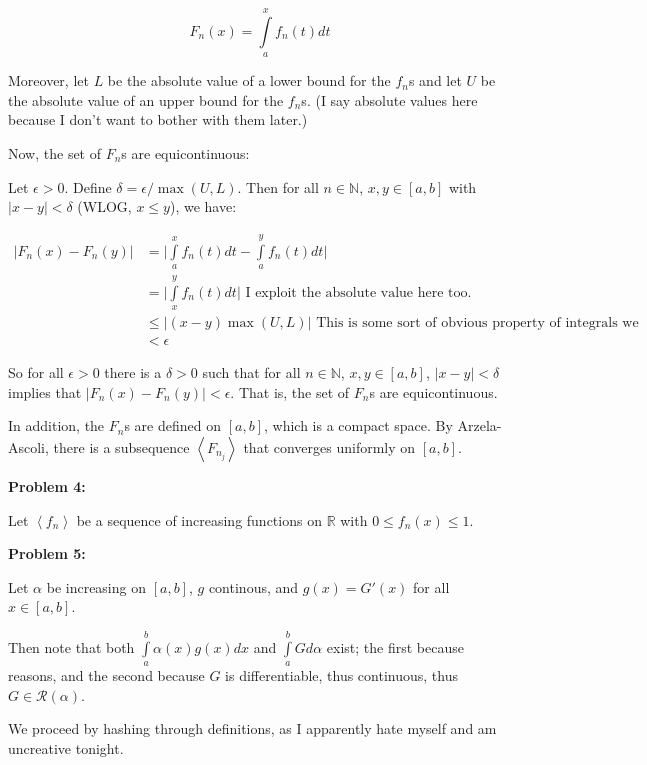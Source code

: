 \documentclass[a4paper,12pt]{article}
\newcommand{\tab}{\hspace{4mm}} %
\newcommand{\shunt}{\vspace{20mm}}
\newcommand{\absval}[1]{\lvert #1 \rvert}
\newcommand{\anbrack}[1]{\left\langle #1 \right\rangle}
\newcommand{\al}{\alpha} %
\newcommand{\de}{\delta}
\newcommand{\ep}{\epsilon}
\newcommand{\N}{\mathbb{N}}
\newcommand{\R}{\mathbb{R}}
\newcommand{\scrR}{\mathcal{R}}
\begin{document}
\begin{displaymath}
F_n(x) = \int\limits_a^x f_n(t)dt
\end{displaymath}

Moreover, let $L$ be the absolute value of a lower bound for the $f_n$s and let $U$ be the absolute value of an upper bound for the $f_n$s. (I say absolute values here because I don't want to bother with them later.)

Now, the set of $F_n$s are equicontinuous:

\tab Let $\ep >0$. Define $\de = \ep /\max(U,L)$. Then for all $n \in \N$, $x, y \in [a,b]$ with $\absval{x-y} < \de$ (WLOG, $x \leq y$), we have:

\begin{align*}
\absval{F_n(x)-F_n(y)} &= \absval{\int\limits_a^x f_n(t)dt - \int\limits_a^y f_n(t)dt} \\
&= \absval{\int\limits_x^y f_n(t)dt} \text{ I exploit the absolute value here too.} \\
&\leq \absval{(x-y)\max(U,L)} \text{ This is some sort of obvious property of integrals we should know} \\
&< \ep
\end{align*}

\tab So for all $\ep>0$ there is a $\de >0$ such that for all $n \in \N$, $x,y \in [a,b]$, $\absval{x-y} < \de$ implies that $\absval{F_n(x)-F_n(y)} < \ep$. That is, the set of $F_n$s are equicontinuous.

In addition, the $F_n$s are defined on $[a,b]$, which is a compact space. By Arzela-Ascoli, there is a subsequence $\anbrack{F_{n_j}}$ that converges uniformly on $[a,b]$.

\shunt

{\bf Problem 4:}

Let $\anbrack{f_n}$ be a sequence of increasing functions on $\R$ with $0 \leq f_n(x) \leq 1$. 

\shunt

{\bf Problem 5:}

Let $\al$ be increasing on $[a,b]$, $g$ continous, and $g(x) = G'(x)$ for all $x \in [a,b]$.

Then note that both $\int\limits_a^b \al(x)g(x)dx$ and $\int\limits_a^b Gd\al$ exist; the first because reasons, and the second because $G$ is differentiable, thus continuous, thus $G \in \scrR(\al)$.

We proceed by hashing through definitions, as I apparently hate myself and am uncreative tonight.
\end{document}
